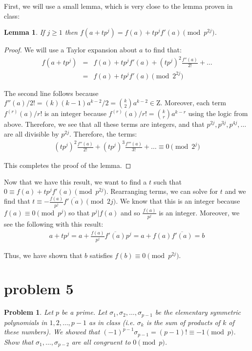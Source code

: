 \documentclass[psamsfonts]{amsart}
\newtheorem{prob}{Problem}[section]
\newtheorem{lem}[thm]{Lemma}
\newenvironment{sol}{{\bfseries Solution}}{\qedsymbol}
\theoremstyle{definition}
\theoremstyle{remark}
\numberwithin{equation}{section}
\begin{document}
\begin{sol}
First, we will use a small lemma, which is very close to the lemma proven in class:
\begin{lem}
If $j \geq 1$ then $f(a + t p^{j}) = f(a) + t p^{j} f'(a) \pmod{p^{2j}}$.
\end{lem}
\begin{proof}
We will use a Taylor expansion about $a$ to find that:
\begin{eqnarray}
f(a + t p^{j}) &=& f(a) + t p^{j} f'(a) + (t p^{j})^2 \frac{f''(a)}{2!} + \ldots \\
&=& f(a) + t p^{j} f'(a) \pmod{2^{2j}}
\end{eqnarray}

The second line follows because $f''(a)/2! = (k)(k-1)a^{k-2}/2 = {k \choose 2} a^{k - 2} \in \mathrm{Z}$. Moreover, each term $f^{(r)}(a) / r!$ is an integer because $f^{(r)}(a)/r! = {k \choose r} a^{k - r}$ using the logic from above. Therefore, we see that all these terms are integers, and that $p^{2j}, p^{3j}, p^{4j}, \ldots$ are all divisible by $p^{2j}$. Therefore, the terms:
\begin{eqnarray}
(tp^j)^{2} \frac{f''(a)}{2!} + (tp^{j})^3 \frac{ f'''(a)}{3!} + \ldots \equiv 0 \pmod{2^{j}}
\end{eqnarray}

This completes the proof of the lemma.
\end{proof}

Now that we have this result, we want to find a $t$ such that $0 \equiv f(a) + t p^{j} f'(a) \pmod{p^{2j}}$. Rearranging terms, we can solve for $t$ and we find that $t \equiv -\frac{f(a)}{p^{j}} \overline{f'(a)} \pmod{2j}$. We know that this is an integer because $f(a) \equiv 0 \pmod{p^{j}}$ so that $p^{j} | f(a)$ and so $\frac{f(a)}{p^j}$ is an integer. Moreover, we see the following with this result:
\begin{eqnarray}
a + tp^j = a + \frac{f(a)}{p^j} \overline{f'(a)} p^j = a + f(a) \overline{f'(a)} = b
\end{eqnarray}

Thus, we have shown that $b$ satisfies $f(b) \equiv 0 \pmod{p^{2j}}$. 
\end{sol}

\section{problem 5}

\begin{prob}
Let $p$ be a prime. Let $\sigma_1, \sigma_2, \ldots, \sigma_{p-1}$ be the elementary symmetric polynomials in $1,2, \ldots, p-1$ as in class (i.e. $\sigma_k$ is the sum of products of $k$ of these numbers). We showed that $(-1)^{p-1} \sigma_{p-1} = (p-1)! \equiv -1 \pmod{p}$. Show that $\sigma_{1}, \ldots, \sigma_{p-2}$ are all congruent to $0 \pmod{p}$.
\end{prob}
\end{document}
